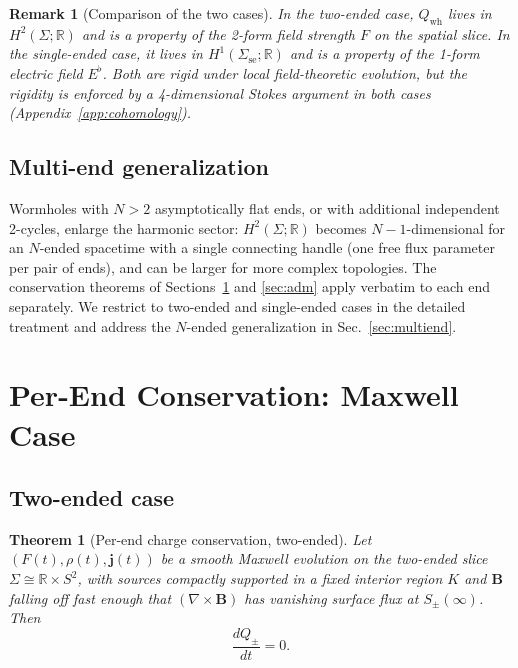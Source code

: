 \documentclass[aps,prd,onecolumn,nofootinbib,superscriptaddress]{revtex4-2}
\newtheorem{theorem}{Theorem}
\newtheorem{remark}{Remark}
\begin{document}
\begin{remark}[Comparison of the two cases]
In the two-ended case, $Q_{\mathrm{wh}}$ lives in $H^2(\Sigma;\mathbb{R})$ and
is a property of the 2-form field strength $F$ on the spatial slice.  In the
single-ended case, it lives in $H^1(\Sigma_{\mathrm{se}};\mathbb{R})$ and is a
property of the 1-form electric field $E^\flat$.  Both are rigid under local
field-theoretic evolution, but the rigidity is enforced by a 4-dimensional
Stokes argument in both cases (Appendix~\ref{app:cohomology}).
\end{remark}

\subsection{Multi-end generalization}

Wormholes with $N>2$ asymptotically flat ends, or with additional independent
2-cycles, enlarge the harmonic sector: $H^2(\Sigma;\mathbb{R})$ becomes
$N-1$-dimensional for an $N$-ended spacetime with a single connecting handle
(one free flux parameter per pair of ends), and can be larger for more complex
topologies.  The conservation theorems of Sections~\ref{sec:maxwell} and
\ref{sec:adm} apply verbatim to each end separately.  We restrict to two-ended
and single-ended cases in the detailed treatment and address the $N$-ended
generalization in Sec.~\ref{sec:multiend}.

\section{Per-End Conservation: Maxwell Case}
\label{sec:maxwell}

\subsection{Two-ended case}

\begin{theorem}[Per-end charge conservation, two-ended]
\label{thm:Q-conservation-2e}
Let $(F(t),\rho(t),\bm{j}(t))$ be a smooth Maxwell evolution on the two-ended
slice $\Sigma\cong\mathbb{R}\times S^2$, with sources compactly supported in a
fixed interior region $K$ and $\bm{B}$ falling off fast enough that
$(\nabla\times\bm{B})$ has vanishing surface flux at $S_\pm(\infty)$.  Then
\begin{equation}
  \frac{dQ_\pm}{dt} = 0.
\end{equation}
\end{theorem}
\end{document}
